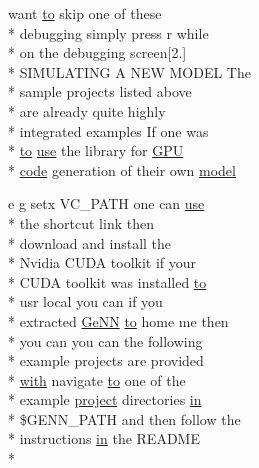 \begin{DoxyCompactItemize}
want \hyperlink{README_8txt_add1f2ee32acc15ef77f839d4382c9768}{to} skip one of these \\*
debugging simply press r while \\*
on the debugging screen\mbox{[}2.\mbox{]} \\*
S\+I\+M\+U\+L\+A\+T\+I\+N\+G A N\+E\+W M\+O\+D\+E\+L The \\*
sample projects listed above \\*
are already quite highly \\*
integrated examples If one was \\*
\hyperlink{README_8txt_add1f2ee32acc15ef77f839d4382c9768}{to} \hyperlink{README_8txt_acf386c48a14a2099c9220d6bcde40fc8}{use} the library for \hyperlink{modelSpec_8h_a39cb9803524b6f3b783344b2f89867b4}{G\+P\+U} \\*
\hyperlink{userproject_2MBody__userdef__project_2README_8txt_aeec4e596748e7c29dd5548dae4c70685}{code} generation of their own \hyperlink{README_8txt_a69fd801b7213948c12d9dd7eebb3ed14}{model}
\item 
e g setx V\+C\+\_\+\+P\+A\+T\+H one can \hyperlink{README_8txt_acf386c48a14a2099c9220d6bcde40fc8}{use} \\*
the shortcut link then \\*
download and install the \\*
Nvidia C\+U\+D\+A toolkit if your \\*
C\+U\+D\+A toolkit was installed \hyperlink{README_8txt_add1f2ee32acc15ef77f839d4382c9768}{to} \\*
usr local you can if you \\*
extracted \hyperlink{README_8txt_a431a8d9aae97c72793fee7c3edd68559}{Ge\+N\+N} \hyperlink{README_8txt_add1f2ee32acc15ef77f839d4382c9768}{to} home me then \\*
you can you can the following \\*
example projects are provided \\*
\hyperlink{userproject_2OneComp__project_2README_8txt_ace09bb40fbf4457ad9a9340a67a4fa9a}{with} navigate \hyperlink{README_8txt_add1f2ee32acc15ef77f839d4382c9768}{to} one of the \\*
example \hyperlink{userproject_2SynDelay__project_2README_8txt_a762c750134e07a31b7965860fd292b51}{project} directories \hyperlink{README_8txt_a148897a6b2cc9cff25af80abb13426b0}{in} \\*
\$G\+E\+N\+N\+\_\+\+P\+A\+T\+H and then follow the \\*
instructions \hyperlink{README_8txt_a148897a6b2cc9cff25af80abb13426b0}{in} the R\+E\+A\+D\+M\+E \\*

\end{DoxyCompactItemize}
